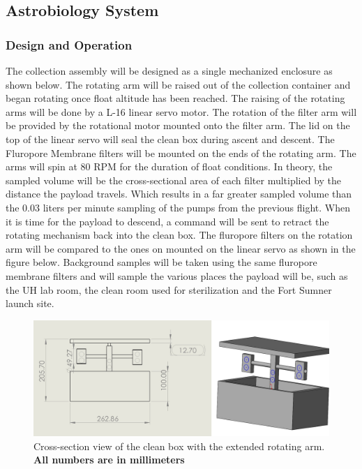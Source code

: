 \subsection{Astrobiology System}
\label{sec:AstrobiologySystem}

\subsubsection{Design and Operation}
The collection assembly will be designed as a single mechanized enclosure as shown below. The rotating arm will be raised out of the collection container and began rotating once float altitude has been reached. The raising of the rotating arms will be done by a L-16 linear servo motor. The rotation of the filter arm will be provided by the rotational motor mounted onto the filter arm. The lid on the top of the linear servo will seal the clean box during ascent and descent. The  Fluropore Membrane filters will be mounted on the ends of the rotating arm. The arms will spin at 80 RPM for the duration of float conditions. In theory, the sampled volume will be the cross-sectional area of each filter multiplied by the distance the payload travels. Which results in a far greater sampled volume than the 0.03 liters per minute sampling of the pumps from the previous flight.\cite{SORA2} When it is time for the payload to descend, a command will be sent to retract the rotating mechanism back into the clean box. The fluropore filters on the rotation arm will be compared to the ones on mounted on the linear servo as shown in the figure below. Background samples will be taken using the same fluropore membrane filters and will sample the various places the payload will be, such as the UH lab room, the clean room used for sterilization and the Fort Sumner launch site. 

\begin{figure}[!h] 
	\begin{center}
		\includegraphics[width=\linewidth]{Figures/T-Arm.jpg}
		\caption{Cross-section view of the clean box with the extended rotating arm. \bf All numbers are in millimeters}
		\label{fig:AstroBox}
	\end{center}
\end{figure} 
